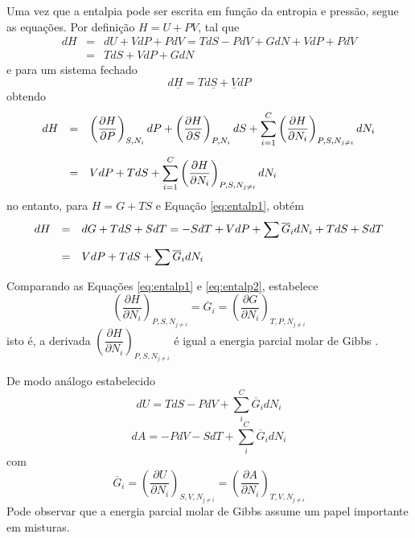 Uma vez que a entalpia pode ser escrita em função da entropia e pressão, segue as equações. 
Por definição $H=U+PV$, tal que
\begin{equation}
    \begin{array}{rcl}
        dH&=&dU+V dP+P dV = T dS - P dV + G dN + V dP + P dV \\
         & = & T dS + V dP + G dN
    \end{array}
\end{equation}
e para um sistema fechado
\begin{equation}
    d\underline{H} = T d\underline{S} + \underline{V} dP
\end{equation}
obtendo
\begin{equation}\label{eq:entalp1}
    \begin{array}{rcl}
        dH & = & \left(\dfrac{\partial H}{\partial P}\right)_{S,N_i}dP + \left(\dfrac{\partial H}{\partial S}\right)_{P,N_i}dS + \displaystyle\sum_{i=1}^{C}\left(\dfrac{\partial H}{\partial N_i}\right)_{P,S,N_{j\neq i}}dN_i  \vspace{3mm}\\
         & = & V dP + T dS + \displaystyle\sum_{i=1}^{C}\left(\dfrac{\partial H}{\partial N_i}\right)_{P,S,N_{j\neq i}}dN_i
    \end{array}
\end{equation}
no entanto, para $H = G + T S$ e Equação \ref{eq:entalp1}, obtém
\begin{equation}\label{eq:entalp2}
    \begin{array}{rcl}
        dH& = & dG + T dS + S dT = -S dT + V dP + \displaystyle\sum  \overline{G}_i dN_i + T dS + S dT\vspace{3mm}\\
          & = & V dP + T dS + \displaystyle\sum  \overline{G}_i dN_i
    \end{array}
\end{equation}

Comparando as Equações \ref{eq:entalp1} e \ref{eq:entalp2}, estabelece
\begin{equation}
    \left(\dfrac{\partial H}{\partial N_i}\right)_{P,S,N_{j\neq i}} = \overline{G}_i = \left(\dfrac{\partial G}{\partial N_i}\right)_{T,P,N_{j\neq i}}
\end{equation}
isto é, a derivada $\left(\dfrac{\partial H}{\partial N_i}\right)_{P,S,N_{j\neq i}}$ é igual a energia parcial molar de Gibbs .

De modo análogo estabelecido
\begin{equation}
    dU = T dS - P dV + \displaystyle\sum_{i}^{C} \overline{G}_i dN_i
\end{equation}
\begin{equation}
    dA = - P dV - S dT + \displaystyle\sum_{i}^{C} \overline{G}_i dN_i
\end{equation}
com
\begin{equation*}
    \overline{G}_i=\left(\dfrac{\partial U}{\partial N_i}\right)_{S,V,N_{j\neq i}}=\left(\dfrac{\partial A}{\partial N_i}\right)_{T,V,N_{j\neq i}}
\end{equation*}
Pode observar que a energia parcial molar de Gibbs assume um papel importante em misturas. 

